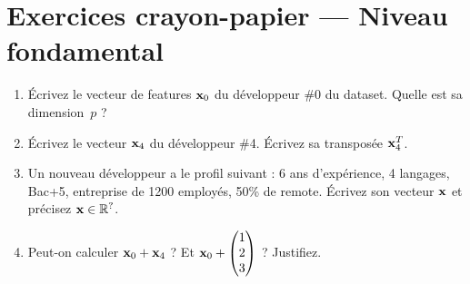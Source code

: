 \section*{Exercices crayon-papier --- Niveau fondamental}


\begin{enumerate}[label=\alph*)]
    \item \'{E}crivez le vecteur de features $\mathbf{x}_0$ du d\'{e}veloppeur \#0 du dataset.
        Quelle est sa dimension~$p$ ?

    \item \'{E}crivez le vecteur $\mathbf{x}_4$ du d\'{e}veloppeur \#4. \'{E}crivez sa transpos\'{e}e $\mathbf{x}_4^T$.

    \item Un nouveau d\'{e}veloppeur a le profil suivant : 6 ans d'exp\'{e}rience,
        4 langages, Bac+5, entreprise de 1200 employ\'{e}s, 50\% de remote.
        \'{E}crivez son vecteur $\mathbf{x}$ et pr\'{e}cisez $\mathbf{x} \in \mathbb{R}^{?}$.

    \item Peut-on calculer $\mathbf{x}_0 + \mathbf{x}_4$ ? Et $\mathbf{x}_0 + \begin{pmatrix} 1 \\ 2 \\ 3 \end{pmatrix}$ ?
        Justifiez.
\end{enumerate}


